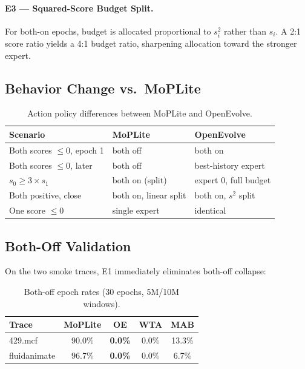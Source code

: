 \documentclass[10pt,twocolumn]{article}
\begin{document}
\paragraph{E3 — Squared-Score Budget Split.} For both-on epochs, budget is allocated
proportional to $s_i^2$ rather than $s_i$. A 2:1 score ratio yields a 4:1 budget
ratio, sharpening allocation toward the stronger expert.

\subsection{Behavior Change vs.\ MoPLite}

\begin{table}[h]
\centering
\caption{Action policy differences between MoPLite and OpenEvolve.}
\label{tab:policy_diff}
\small
\begin{tabular}{p{3cm}p{2cm}p{2cm}}
\toprule
\textbf{Scenario} & \textbf{MoPLite} & \textbf{OpenEvolve} \\
\midrule
Both scores $\leq 0$, epoch 1 & both off & both on \\
Both scores $\leq 0$, later & both off & best-history expert \\
$s_0 \geq 3 \times s_1$ & both on (split) & expert 0, full budget \\
Both positive, close & both on, linear split & both on, $s^2$ split \\
One score $\leq 0$ & single expert & identical \\
\bottomrule
\end{tabular}
\end{table}

\subsection{Both-Off Validation}

On the two smoke traces, E1 immediately eliminates both-off collapse:

\begin{table}[h]
\centering
\caption{Both-off epoch rates (30 epochs, 5M/10M windows).}
\label{tab:both_off}
\small
\begin{tabular}{lcccc}
\toprule
\textbf{Trace} & \textbf{MoPLite} & \textbf{OE} & \textbf{WTA} & \textbf{MAB} \\
\midrule
429.mcf        & 90.0\% & \textbf{0.0\%} & 0.0\% & 13.3\% \\
fluidanimate   & 96.7\% & \textbf{0.0\%} & 0.0\% & 6.7\%  \\
\bottomrule
\end{tabular}
\end{table}
\end{document}

